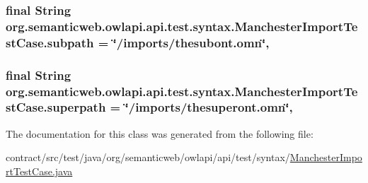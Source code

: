 \hypertarget{classorg_1_1semanticweb_1_1owlapi_1_1api_1_1test_1_1syntax_1_1_manchester_import_test_case_a485fa8bea88923b6716534ce72a5341e}{
\subsubsection[{subpath}]{\setlength{\rightskip}{0pt plus 5cm}final String org.\-semanticweb.\-owlapi.\-api.\-test.\-syntax.\-Manchester\-Import\-Test\-Case.\-subpath = \char`\"{}/imports/thesubont.\-omn\char`\"{}\hspace{0.3cm}{\ttfamily [static]}, {\ttfamily [private]}}}\label{classorg_1_1semanticweb_1_1owlapi_1_1api_1_1test_1_1syntax_1_1_manchester_import_test_case_a485fa8bea88923b6716534ce72a5341e}
\hypertarget{classorg_1_1semanticweb_1_1owlapi_1_1api_1_1test_1_1syntax_1_1_manchester_import_test_case_a5ace9cf760934e3ae989815e4dc5cb22}{
\subsubsection[{superpath}]{\setlength{\rightskip}{0pt plus 5cm}final String org.\-semanticweb.\-owlapi.\-api.\-test.\-syntax.\-Manchester\-Import\-Test\-Case.\-superpath = \char`\"{}/imports/thesuperont.\-omn\char`\"{}\hspace{0.3cm}{\ttfamily [static]}, {\ttfamily [private]}}}\label{classorg_1_1semanticweb_1_1owlapi_1_1api_1_1test_1_1syntax_1_1_manchester_import_test_case_a5ace9cf760934e3ae989815e4dc5cb22}


The documentation for this class was generated from the following file\-:\begin{DoxyCompactItemize}
\item 
contract/src/test/java/org/semanticweb/owlapi/api/test/syntax/\hyperlink{_manchester_import_test_case_8java}{Manchester\-Import\-Test\-Case.\-java}\end{DoxyCompactItemize}
